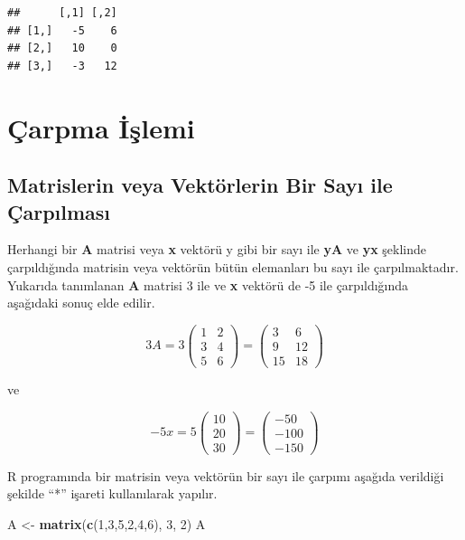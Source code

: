 \documentclass[
]{book}
\newenvironment{Shaded}{\begin{snugshade}}{\end{snugshade}}
\newcommand{\DecValTok}[1]{\textcolor[rgb]{0.00,0.00,0.81}{#1}}
\newcommand{\FunctionTok}[1]{\textcolor[rgb]{0.13,0.29,0.53}{\textbf{#1}}}
\newcommand{\NormalTok}[1]{#1}
\newcommand{\OtherTok}[1]{\textcolor[rgb]{0.56,0.35,0.01}{#1}}
\begin{document}
\begin{verbatim}
##      [,1] [,2]
## [1,]   -5    6
## [2,]   10    0
## [3,]   -3   12
\end{verbatim}

\section{Çarpma İşlemi}\label{uxe7arpma-iux15flemi}

\subsection{Matrislerin veya Vektörlerin Bir Sayı ile Çarpılması}\label{matrislerin-veya-vektuxf6rlerin-bir-sayux131-ile-uxe7arpux131lmasux131}

Herhangi bir \textbf{A} matrisi veya \textbf{x} vektörü y gibi bir sayı ile \textbf{yA} ve \textbf{yx} şeklinde çarpıldığında matrisin veya vektörün bütün elemanları bu sayı ile çarpılmaktadır. Yukarıda tanımlanan \textbf{A} matrisi 3 ile ve \textbf{x} vektörü de -5 ile çarpıldığında aşağıdaki sonuç elde edilir.

\[3A=3
\begin{pmatrix}
 1 & 2 \\
 3 & 4 \\
 5 & 6
\end{pmatrix}
=
\begin{pmatrix}
 3 & 6 \\
 9 & 12 \\
 15 & 18
\end{pmatrix} \]

ve

\[-5x=5
\begin{pmatrix}
 10 \\
 20 \\
 30
\end{pmatrix}
=
\begin{pmatrix}
 -50 \\
 -100 \\
 -150
\end{pmatrix} \]

R programında bir matrisin veya vektörün bir sayı ile çarpımı aşağıda verildiği şekilde ``*'' işareti kullanılarak yapılır.

\begin{Shaded}
\begin{Highlighting}[]
\NormalTok{ A }\OtherTok{\textless{}{-}} \FunctionTok{matrix}\NormalTok{(}\FunctionTok{c}\NormalTok{(}\DecValTok{1}\NormalTok{,}\DecValTok{3}\NormalTok{,}\DecValTok{5}\NormalTok{,}\DecValTok{2}\NormalTok{,}\DecValTok{4}\NormalTok{,}\DecValTok{6}\NormalTok{), }\DecValTok{3}\NormalTok{, }\DecValTok{2}\NormalTok{) }
\NormalTok{ A }
\end{Highlighting}
\end{Shaded}
\end{document}
